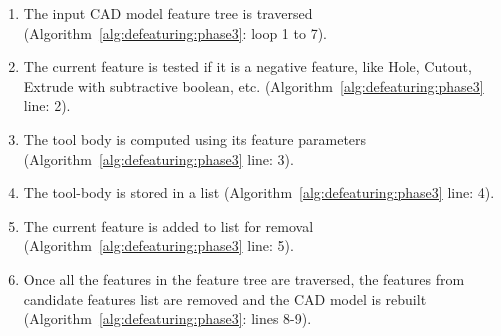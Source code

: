 \bigskip


\begin{enumerate}
[noitemsep,topsep=2pt,parsep=2pt,partopsep=2pt]
\item The input CAD model feature tree is traversed (Algorithm~\ref{alg:defeaturing:phase3}: loop 1 to 7). 
\item  The current feature is tested if it is a negative feature, like Hole, Cutout, Extrude with subtractive boolean, etc. (Algorithm~\ref{alg:defeaturing:phase3} line: 2). 
\item The tool body is computed using its feature parameters (Algorithm~\ref{alg:defeaturing:phase3} line: 3). 
\item The tool-body is stored in a list (Algorithm~\ref{alg:defeaturing:phase3} line: 4). 
\item The current feature is added to list for removal (Algorithm~\ref{alg:defeaturing:phase3} line: 5). 
\item Once all the features in the feature tree are traversed, the features from candidate features list are removed and the CAD model is rebuilt (Algorithm~\ref{alg:defeaturing:phase3}: lines 8-9).
\end{enumerate}







	


